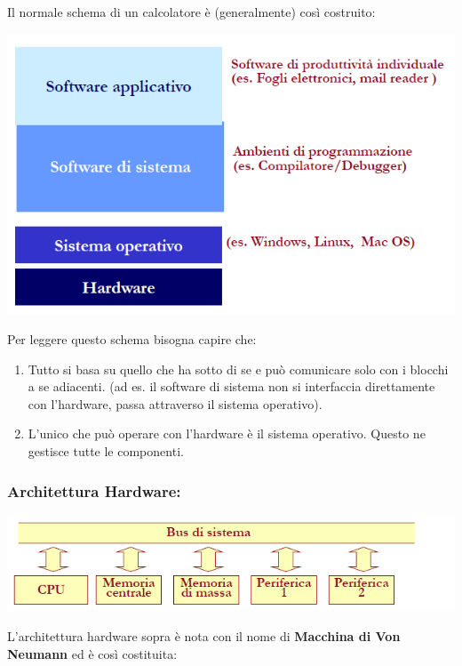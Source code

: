 \documentclass[
  paper=a4,
  oneside  ,captions=tableheading
]{scrbook}
\providecommand{\tightlist}{%
  \setlength{\itemsep}{0pt}\setlength{\parskip}{0pt}}
\begin{document}
Il normale schema di un calcolatore è (generalmente) così costruito:

\includegraphics{./image/image-20201111172243268.png}

Per leggere questo schema bisogna capire che:

\begin{enumerate}
\def\labelenumi{\arabic{enumi}.}
\tightlist
\item
  Tutto si basa su quello che ha sotto di se e può comunicare solo con i
  blocchi a se adiacenti. (ad es. il software di sistema non si
  interfaccia direttamente con l'hardware, passa attraverso il sistema
  operativo).
\item
  L'unico che può operare con l'hardware è il sistema operativo. Questo
  ne gestisce tutte le componenti.
\end{enumerate}

\hypertarget{architettura-hardware}{%
\subsubsection{Architettura Hardware:}\label{architettura-hardware}}

\includegraphics{./image/image-20201111172642835.png}

L'architettura hardware sopra è nota con il nome di \textbf{Macchina di
Von Neumann} ed è così costituita:
\end{document}
